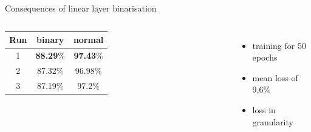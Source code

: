 \documentclass[aspectratio=1610, 12pt]{beamer}
\begin{document}
\begin{frame}{Consequences of linear layer binarisation}


\begin{columns}
	\centering
		\begin{tabular}{|c|c|c|}\hline
		Run&binary&normal\\\hline
		1&\textbf{88.29}\%&\textbf{97.43}\%\\\hline
		2&87.32\%&96.98\%\\\hline
		3&87.19\%&97.2\%\\\hline
	\end{tabular}	
	\begin{itemize}
		\item training for 50 epochs
		\item mean loss of 9,6\%
		\item loss in granularity
	\end{itemize}
	
\end{columns}


\end{frame}
\end{document}
